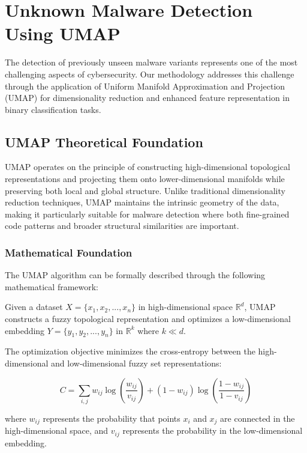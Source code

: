 \section{Unknown Malware Detection Using UMAP}
\label{sec:umap-detection}

The detection of previously unseen malware variants represents one of the most challenging aspects of cybersecurity. Our methodology addresses this challenge through the application of Uniform Manifold Approximation and Projection (UMAP) for dimensionality reduction and enhanced feature representation in binary classification tasks.

\subsection{UMAP Theoretical Foundation}
\label{subsec:umap-theory}

UMAP operates on the principle of constructing high-dimensional topological representations and projecting them onto lower-dimensional manifolds while preserving both local and global structure. Unlike traditional dimensionality reduction techniques, UMAP maintains the intrinsic geometry of the data, making it particularly suitable for malware detection where both fine-grained code patterns and broader structural similarities are important.

\subsubsection{Mathematical Foundation}

The UMAP algorithm can be formally described through the following mathematical framework:

Given a dataset $X = \{x_1, x_2, ..., x_n\}$ in high-dimensional space $\mathbb{R}^d$, UMAP constructs a fuzzy topological representation and optimizes a low-dimensional embedding $Y = \{y_1, y_2, ..., y_n\}$ in $\mathbb{R}^k$ where $k \ll d$.

The optimization objective minimizes the cross-entropy between the high-dimensional and low-dimensional fuzzy set representations:

\begin{equation}
C = \sum_{i,j} w_{ij} \log\left(\frac{w_{ij}}{v_{ij}}\right) + (1-w_{ij}) \log\left(\frac{1-w_{ij}}{1-v_{ij}}\right)
\end{equation}

where $w_{ij}$ represents the probability that points $x_i$ and $x_j$ are connected in the high-dimensional space, and $v_{ij}$ represents the probability in the low-dimensional embedding.

